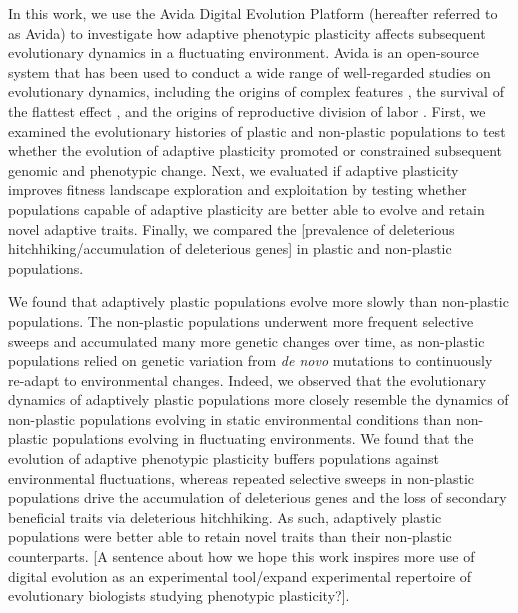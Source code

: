 
In this work, we use the Avida Digital Evolution Platform (hereafter referred to as Avida) \citep{ofria_avida:_2009} to investigate how adaptive phenotypic plasticity affects subsequent evolutionary dynamics in a fluctuating environment.
Avida is an open-source system that has been used to conduct a wide range of well-regarded studies on evolutionary dynamics, including 
the origins of complex features \citep{lenski_evolutionary_2003},
the survival of the flattest effect \citep{wilke_evolution_2001},
and the origins of reproductive division of labor \citep{goldsby_evolutionary_2014}.
First, we examined the evolutionary histories of plastic and non-plastic populations to test whether the evolution of adaptive plasticity promoted or constrained subsequent genomic and phenotypic change.
Next, we evaluated if adaptive plasticity improves fitness landscape exploration and exploitation by testing whether populations capable of adaptive plasticity are better able to evolve and retain novel adaptive traits. 
Finally, we compared the [prevalence of deleterious hitchhiking/accumulation of deleterious genes] in plastic and non-plastic populations. 

We found that adaptively plastic populations evolve more slowly than non-plastic populations. 
The non-plastic populations underwent more frequent selective sweeps and accumulated many more genetic changes over time, as non-plastic populations relied on genetic variation from \textit{de novo} mutations to continuously re-adapt to environmental changes. 
Indeed, we observed that the evolutionary dynamics of adaptively plastic populations more closely resemble the dynamics of non-plastic populations evolving in static environmental conditions than non-plastic populations evolving in fluctuating environments.
We found that the evolution of adaptive phenotypic plasticity buffers populations against environmental fluctuations, whereas repeated selective sweeps in non-plastic populations drive the accumulation of deleterious genes and the loss of secondary beneficial traits via deleterious hitchhiking.
As such, adaptively plastic populations were better able to retain novel traits than their non-plastic counterparts.
[A sentence about how we hope this work inspires more use of digital evolution as an experimental tool/expand experimental repertoire of evolutionary biologists studying phenotypic plasticity?].